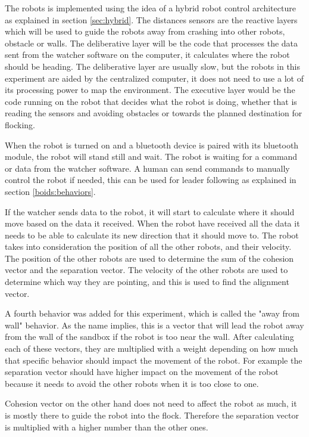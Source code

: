 The robots is implemented using the idea of a hybrid robot control architecture as explained in section \ref{sec:hybrid}. The distances sensors are the reactive layers which will be used to guide the robots away from crashing into other robots, obstacle or walls. The deliberative layer will be the code that processes the data sent from the watcher software on the computer, it calculates where the robot should be heading. The deliberative layer are usually slow, but the robots in this experiment are aided by the centralized computer, it does not need to use a lot of its processing power to map the environment.
The executive layer would be the code running on the robot that decides what the robot is doing, whether that is reading the sensors and avoiding obstacles or towards the planned destination for flocking.

When the robot is turned on and a bluetooth device is paired with its bluetooth module, the robot will stand still and wait. The robot is waiting for a command or data from the watcher software. A human can send commands to manually control the robot if needed, this can be used for leader following as explained in section \ref{boids:behaviors}. 

If the watcher sends data to the robot, it will start to calculate where it should move based on the data it received. 
When the robot have received all the data it needs to be able to calculate its new direction that it should move to. The robot takes into consideration the position of all the other robots, and their velocity. The position of the other robots are used to determine the sum of the cohesion vector and the separation vector. The velocity of the other robots are used to determine which way they are pointing, and this is used to find the alignment vector. 

A fourth behavior was added for this experiment, which is called the "away from wall" behavior. As the name implies, this is a vector that will lead the robot away from the wall of the sandbox if the robot is too near the wall. After calculating each of these vectors, they are multiplied with a weight depending on how much that specific behavior should impact the movement of the robot. For example the separation vector should have higher impact on the movement of the robot because it needs to avoid the other robots when it is too close to one. 

Cohesion vector on the other hand does not need to affect the robot as much, it is mostly there to guide the robot into the flock. Therefore the separation vector is multiplied with a higher number than the other ones.



